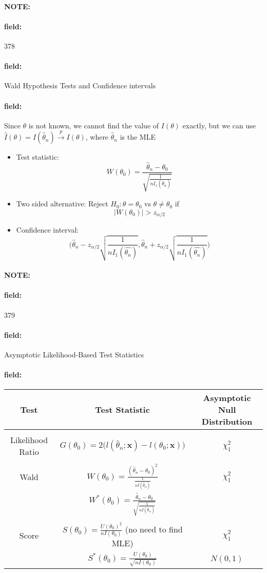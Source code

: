 \documentclass[12pt]{article}
\newenvironment{note}{\paragraph{NOTE:}}{}
\newenvironment{field}{\paragraph{field:}}{}
\begin{document}
\begin{note}
    \begin{field}
        \tiny 378
    \end{field}
    \begin{field}
        Wald Hypothesis Tests and Confidence intervals
    \end{field}
    \begin{field}
        Since $\theta$ is not known, we cannot find the value of $I(\theta)$ exactly, but we can use $\hat{I}(\theta) = I(\hat{\theta}_n) \overset{p}{\to} I(\theta)$, where $\hat{\theta}_n$ is the MLE
        \begin{itemize}
          \item Test statistic: $$W(\theta_0) = \frac{\hat{\theta}_n - \theta_0}{\sqrt{\frac{1}{nI_1(\hat{\theta}_n)}}} $$
          \item Two sided alternative: Reject $H_0: \theta = \theta_0$ vs $\theta \neq \theta_0$ if
          $$|W(\theta_0)| > z_{\alpha/2} $$
          \item Confidence interval:
          $$\bigg( \hat{\theta}_n - z_{\alpha/2} \sqrt{\frac{1}{nI_1(\hat{\theta_n})}}, \hat{\theta}_n + z_{\alpha/2} \sqrt{\frac{1}{nI_1(\hat{\theta_n})}} \bigg) $$
        \end{itemize}
    \end{field}
\end{note}

\begin{note}
    \begin{field}
        \tiny 379
    \end{field}
    \begin{field}
        Asymptotic Likelihood-Based Test Statistics
    \end{field}
    \begin{field}
        \begin{tabular}{c c c }
          Test & Test Statistic & Asymptotic Null Distribution \\
          \hline \\
          Likelihood Ratio & $G(\theta_0) = 2\big(l(\hat{\theta}_n; \mathbf{x}) - l(\theta_0; \mathbf{x})\big)$ & $\chi^2_1$\\
          \hline \\
          Wald & $W(\theta_0) = \frac{(\hat{\theta}_n - \theta_0)^2}{\frac{1}{n I(\hat{\theta}_n)}}$ & $\chi^2_1$\\
          & $W^*(\theta_0) = \frac{\hat{\theta}_n - \theta_0}{\sqrt{\frac{1}{n I(\hat{\theta}_n)}}}$ \\
          \hline \\
          Score & $S(\theta_0) = \frac{U(\theta_0)^2}{nI(\theta_0)}$ (no need to find MLE) & $\chi^2_1$ \\
          & $S^*(\theta_0) = \frac{U(\theta_0)}{\sqrt{nI(\theta_0)}}$ & $N(0,1)$
        \end{tabular}
    \end{field}
\end{note}
\end{document}
